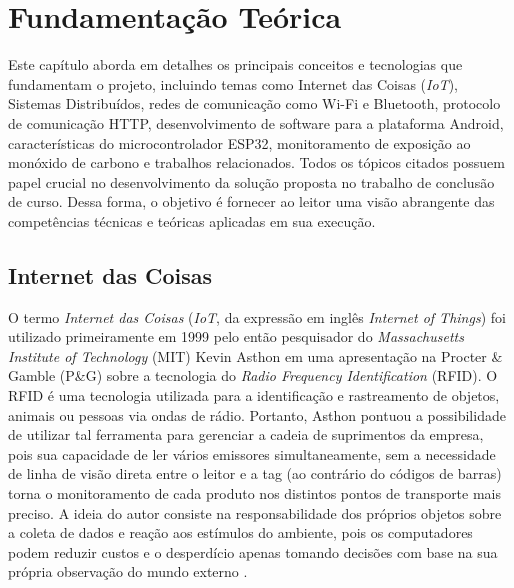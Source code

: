 \chapter{Fundamentação Teórica}

Este capítulo aborda em detalhes os principais conceitos e tecnologias que fundamentam o projeto, incluindo temas como Internet das Coisas (\textit{IoT}), Sistemas Distribuídos, 
redes de comunicação como Wi-Fi e Bluetooth, protocolo de comunicação HTTP, desenvolvimento de software para a plataforma Android, características do microcontrolador ESP32, monitoramento de 
exposição ao monóxido de carbono e trabalhos relacionados. Todos os tópicos citados possuem papel crucial no desenvolvimento da solução proposta no trabalho de conclusão de curso. Dessa forma, o
objetivo é fornecer ao leitor uma visão abrangente das competências técnicas e teóricas aplicadas em sua execução.

\section{Internet das Coisas}

O termo \textit{Internet das Coisas} (\textit{IoT}, da expressão em inglês \textit{Internet of Things}) foi utilizado primeiramente em 1999 pelo então pesquisador do \textit{Massachusetts Institute of Technology} (MIT) Kevin Asthon em 
uma apresentação na Procter \& Gamble (P\&G) sobre a tecnologia do \textit{Radio Frequency Identification} (RFID). O RFID é uma tecnologia utilizada para a identificação e rastreamento de objetos, animais ou pessoas 
via ondas de rádio. Portanto, Asthon pontuou a possibilidade de utilizar tal ferramenta para gerenciar a cadeia de suprimentos da empresa, pois sua capacidade de ler vários emissores simultaneamente, sem a necessidade de linha de visão direta entre o leitor 
e a tag (ao contrário do códigos de barras) torna o monitoramento de cada produto nos distintos pontos de transporte mais preciso. A ideia do autor consiste na responsabilidade dos próprios objetos sobre a coleta de dados
e reação aos estímulos do ambiente, pois os computadores podem reduzir custos e o desperdício apenas tomando decisões com base na sua própria observação do mundo externo \cite{iot-first-definition}.

